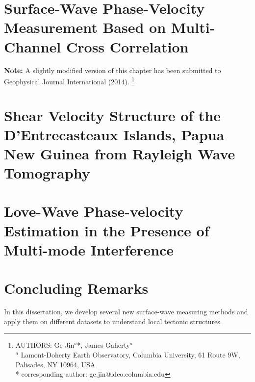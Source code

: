 \documentclass[12pt,oneside]{book}
\begin{document}
\chapter[Surface-Wave Measurement Based on Cross Correlation]{Surface-Wave Phase-Velocity Measurement Based on Multi-Channel Cross Correlation}
\label{ch:aswms}
\doublespacing

\thispagestyle{fancy}

\begin{raggedright}
{\bf Note: } A slightly modified version of this chapter has been submitted to Geophysical Journal International (2014).
\footnote{AUTHORS:  Ge Jin$^a$*,  James Gaherty$^a$\\
$^a$ Lamont-Doherty Earth Observatory, Columbia University, 61 Route 9W, Palisades, NY 10964, USA\\
* corresponding author: ge.jin@ldeo.columbia.edu}
\end{raggedright}
\normalsize





\singlespacing
\chapter[Shear velocity structure of the DI, PNG]{Shear Velocity Structure of the D'Entrecasteaux Islands, Papua New Guinea from Rayleigh Wave Tomography}
\label{ch:png}
\doublespacing

\singlespacing
\chapter[Love-wave Overtone Interference]{Love-Wave Phase-velocity Estimation in the Presence of Multi-mode Interference}
\label{ch:overtone}
\doublespacing

\singlespacing
\chapter[Conclusion]{Concluding Remarks}
\label{ch:conclusion}
\doublespacing

In this dissertation, we develop several new surface-wave measuring methods and apply them on different datasets to understand local tectonic structures.
\end{document}
